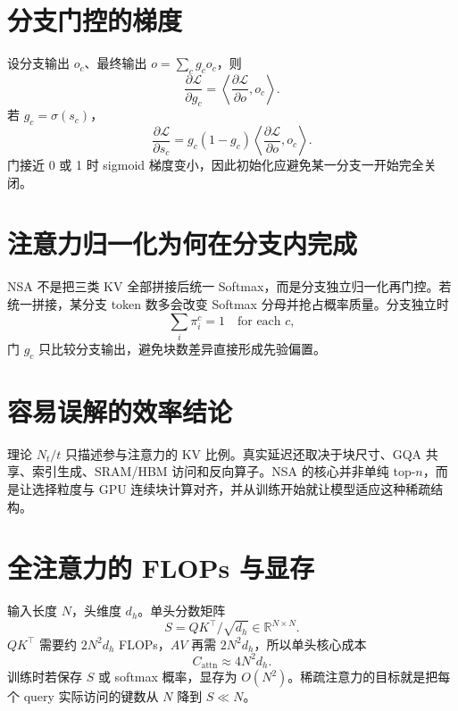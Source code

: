 \documentclass[UTF8,12pt,a4paper,fontset=none]{ctexart}
\numberwithin{equation}{section}
\newcommand{\R}{\mathbb{R}}
\newcommand{\Loss}{\mathcal{L}}
\newcommand{\ip}[2]{\left\langle #1,#2\right\rangle}
\begin{document}
\section{分支门控的梯度}
设分支输出 $o_c$、最终输出 $o=\sum_cg_co_c$，则
\begin{equation}
 \frac{\partial\Loss}{\partial g_c}
 =\ip{\frac{\partial\Loss}{\partial o}}{o_c}.
\end{equation}
若 $g_c=\sigma(s_c)$，
\begin{equation}
 \frac{\partial\Loss}{\partial s_c}
 =g_c(1-g_c)\ip{\frac{\partial\Loss}{\partial o}}{o_c}.
\end{equation}
门接近 0 或 1 时 sigmoid 梯度变小，因此初始化应避免某一分支一开始完全关闭。

\section{注意力归一化为何在分支内完成}
NSA 不是把三类 KV 全部拼接后统一 Softmax，而是分支独立归一化再门控。若统一拼接，某分支 token 数多会改变 Softmax 分母并抢占概率质量。分支独立时
\begin{equation}
 \sum_i\pi_i^c=1\quad\text{for each }c,
\end{equation}
门 $g_c$ 只比较分支输出，避免块数差异直接形成先验偏置。

\section{容易误解的效率结论}
\begin{criticalbox}[稀疏率不是速度]
理论 $N_t/t$ 只描述参与注意力的 KV 比例。真实延迟还取决于块尺寸、GQA 共享、索引生成、SRAM/HBM 访问和反向算子。NSA 的核心并非单纯 top-$n$，而是让选择粒度与 GPU 连续块计算对齐，并从训练开始就让模型适应这种稀疏结构。
\end{criticalbox}

\section{全注意力的 FLOPs 与显存}
输入长度 $N$，头维度 $d_h$。单头分数矩阵
\begin{equation}
 S=QK^\top/\sqrt{d_h}\in\R^{N\times N}.
\end{equation}
$QK^\top$ 需要约 $2N^2d_h$ FLOPs，$AV$ 再需 $2N^2d_h$，所以单头核心成本
\begin{equation}
 C_{\mathrm{attn}}\approx4N^2d_h.
\end{equation}
训练时若保存 $S$ 或 softmax 概率，显存为 $O(N^2)$。稀疏注意力的目标就是把每个 query 实际访问的键数从 $N$ 降到 $S\ll N$。
\end{document}

